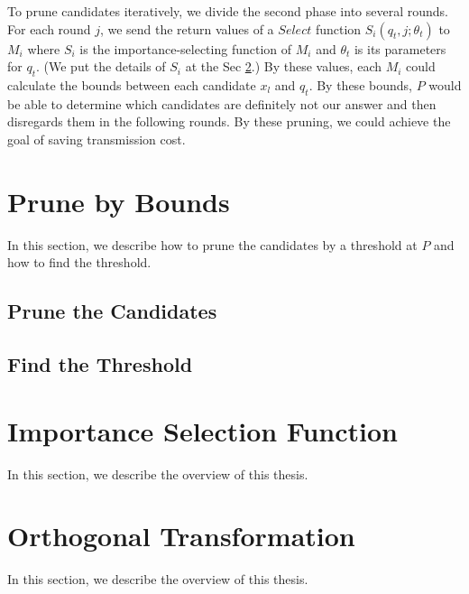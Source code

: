 To prune candidates iteratively, we divide the second phase into several rounds.  For each round $j$, we send the return values of a $Select$ function $S_i(q_t,j;\theta_t)$ to $M_i$ where $S_i$ is the importance-selecting function of $M_i$ and $\theta_t$ is its parameters for $q_t$.  (We put the details of $S_i$ at the Sec \ref{s:selectfun}.)  By these values, each $M_i$ could calculate the bounds between each candidate $x_l$ and $q_t$.  By these bounds, $P$ would be able to determine which candidates are definitely not our answer and then disregards them in the following rounds.  By these pruning, we could achieve the goal of saving transmission cost.

\section{Prune by Bounds}
\label{s:prune}
In this section, we describe how to prune the candidates by a threshold at $P$ and how to find the threshold.

\subsection{Prune the Candidates} %
\label{sub:prune_the_candidates}


\subsection{Find the Threshold} %
\label{sub:find_the_threshold}


\section{Importance Selection Function}
\label{s:selectfun}
In this section, we describe the overview of this thesis.

\section{Orthogonal Transformation}
\label{s:orthogonal}
In this section, we describe the overview of this thesis.

